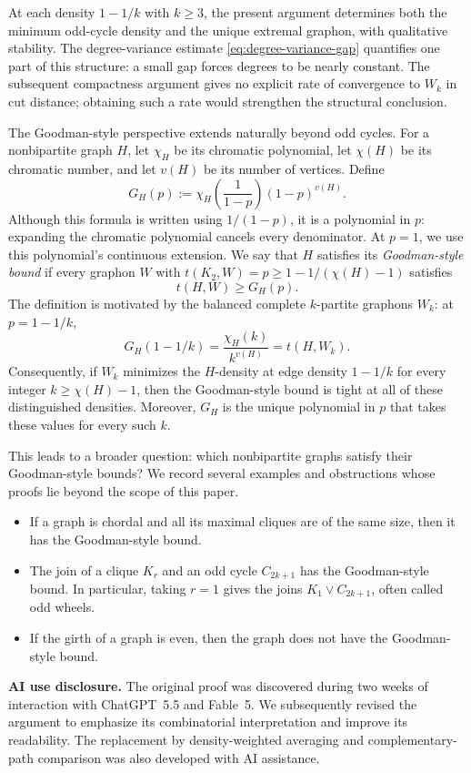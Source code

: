 \documentclass[11pt]{article}
\numberwithin{equation}{section}
\newcommand{\dens}[2]{t(#1,#2)}
\newcommand{\edens}[1]{t(K_{2},#1)}
\begin{document}
At each density $1-1/k$ with $k\ge3$, the present argument determines both the minimum odd-cycle density and the unique extremal graphon, with qualitative stability.
The degree-variance estimate \eqref{eq:degree-variance-gap} quantifies one part of this structure: a small gap forces degrees to be nearly constant.
The subsequent compactness argument gives no explicit rate of convergence to $W_k$ in cut distance; obtaining such a rate would strengthen the structural conclusion.

The Goodman-style perspective extends naturally beyond odd cycles. For a
nonbipartite graph $H$, let $\chi_H$ be its chromatic polynomial, let
$\chi(H)$ be its chromatic number, and let $v(H)$ be its number of vertices.
Define
\[
  G_H(p):=\chi_H\left(\frac{1}{1-p}\right)(1-p)^{v(H)}.
\]
Although this formula is written using $1/(1-p)$, it is a polynomial in
$p$: expanding the chromatic polynomial cancels every denominator. At
$p=1$, we use this polynomial's continuous extension.
We say that $H$ satisfies its \emph{Goodman-style bound} if every graphon
$W$ with $\edens W=p\ge1-1/(\chi(H)-1)$ satisfies
\[
  \dens HW\ge G_H(p).
\]
The definition is motivated by the balanced complete $k$-partite graphons $W_k$:
at $p=1-1/k$,
\[
  G_H(1-1/k)=\frac{\chi_H(k)}{k^{v(H)}}=\dens H{W_k}.
\]
Consequently, if $W_k$ minimizes the $H$-density at edge density $1-1/k$
for every integer $k\ge\chi(H)-1$, then the Goodman-style bound is tight at
all of these distinguished densities. Moreover, $G_H$ is the unique
polynomial in $p$ that takes these values for every such $k$.

This leads to a broader question: which nonbipartite graphs satisfy their
Goodman-style bounds? We record several examples and obstructions whose
proofs lie beyond the scope of this paper.
\begin{itemize}
  \item If a graph is chordal and all its maximal cliques are of the same size, then it has the Goodman-style bound.
  \item The join of a clique $K_r$ and an odd cycle $C_{2k+1}$ has the
  Goodman-style bound. In particular, taking $r=1$ gives the joins
  $K_1\vee C_{2k+1}$, often called odd wheels.
  \item If the girth of a graph is even, then the graph does not have the
  Goodman-style bound.
\end{itemize}

\medskip
\noindent\textbf{AI use disclosure.}
The original proof was discovered during two weeks of interaction with
ChatGPT~5.5 and Fable~5. We subsequently revised the argument to emphasize
its combinatorial interpretation and improve its readability. The
replacement by density-weighted averaging and complementary-path
comparison was also developed with AI assistance.
\end{document}
